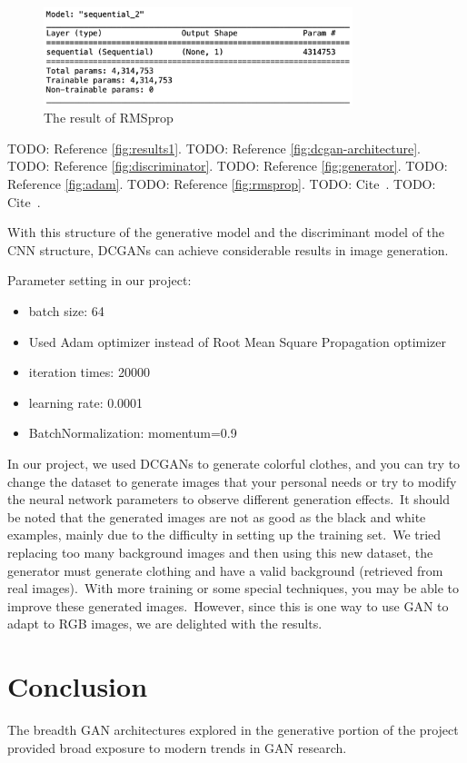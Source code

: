 \documentclass[conference]{IEEEtran}
\begin{document}
    \begin{figure}
        \caption{The result of RMSprop}
        \label{fig:rmsprop}
        \includegraphics[width=9cm]{RMSprop.png}
    \end{figure}

    TODO: Reference \autoref{fig:results1}.
    TODO: Reference \autoref{fig:dcgan-architecture}.
    TODO: Reference \autoref{fig:discriminator}.
    TODO: Reference \autoref{fig:generator}.
    TODO: Reference \autoref{fig:adam}.
    TODO: Reference \autoref{fig:rmsprop}.
    TODO: Cite~\cite{e-in-style}.
    TODO: Cite~\cite{pytorch-generative-model-collections}.

    With this structure of the generative model and the discriminant model of the CNN structure, DCGANs can achieve considerable results in image generation.

    Parameter setting in our project:

    \begin{itemize}
        \item batch size: 64
        \item Used Adam optimizer instead of Root Mean Square Propagation optimizer
        \item iteration times: 20000
        \item learning rate: 0.0001
        \item BatchNormalization: momentum=0.9
    \end{itemize}

    In our project, we used DCGANs to generate colorful clothes, and you can try to change the dataset to generate images that your personal needs or try to modify the neural network parameters to observe different generation effects.\ It should be noted that the generated images are not as good as the black and white examples, mainly due to the difficulty in setting up the training set.\ We tried replacing too many background images and then using this new dataset, the generator must generate clothing and have a valid background (retrieved from real images).\ With more training or some special techniques, you may be able to improve these generated images.\ However, since this is one way to use GAN to adapt to RGB images, we are delighted with the results.

    \section{Conclusion}\label{sec:conclusion}

    The breadth GAN architectures explored in the generative portion of the project provided broad exposure to modern trends in GAN research.

    
    
\end{document}
